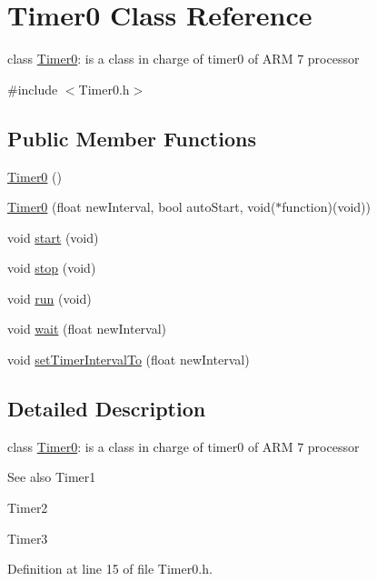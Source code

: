 \hypertarget{class_timer0}{
\section{Timer0 Class Reference}
\label{class_timer0}
}


class \hyperlink{class_timer0}{Timer0}: is a class in charge of timer0 of ARM 7 processor  




{\ttfamily \#include $<$Timer0.h$>$}

\subsection*{Public Member Functions}
\begin{DoxyCompactItemize}
\item 
\hyperlink{class_timer0_a660c8150e1d5462c7e0cd5b5f173bf5a}{Timer0} ()
\item 
\hyperlink{class_timer0_ad9497fedf464ccd6962c8bb366010bb6}{Timer0} (float newInterval, bool autoStart, void($\ast$function)(void))
\item 
void \hyperlink{class_timer0_a05eb482b0059b1f13170a1812d435dc5}{start} (void)
\item 
void \hyperlink{class_timer0_a471f77e9b4db02e4e658975b15c288ca}{stop} (void)
\item 
void \hyperlink{class_timer0_a4a790d8cd03849191892f8e5398eb237}{run} (void)
\item 
void \hyperlink{class_timer0_a58b5706e30695a287c0ee5de3b31aa1d}{wait} (float newInterval)
\item 
void \hyperlink{class_timer0_ac4ef615f850afbf4aa23c7a20442553d}{setTimerIntervalTo} (float newInterval)
\end{DoxyCompactItemize}


\subsection{Detailed Description}
class \hyperlink{class_timer0}{Timer0}: is a class in charge of timer0 of ARM 7 processor 

\begin{DoxySeeAlso}{See also}
Timer1 

Timer2 

Timer3 
\end{DoxySeeAlso}


Definition at line 15 of file Timer0.h.



